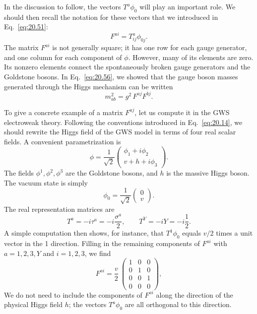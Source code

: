 In the discussion to follow, the vectors $T^a\phi_0$ will play an important
role.  We should then recall the notation for these vectors that we
introduced in Eq.~\eqref{eq:20.51}:
\begin{equation}
  F^{ai} = T^a_{ij}\phi_{0j} .
  \label{eq:21.36}
\end{equation}
The matrix $F^{ai}$ is not generally square; it has one row for each gauge
generator, and one column for each component of $\phi$.  However, many of
its elements are zero.  Its nonzero elements connect the spontaneously broken
gauge generators and the Goldstone bosons.  In Eq.~\eqref{eq:20.56}, we
showed that the gauge boson masses generated through the Higgs mechanism can
be written
\begin{equation}
  m^2_{ab} = g^2\,F^{aj}F^{bj} .
  \label{eq:21.37}
\end{equation}

To give a concrete example of a matrix $F^{aj}$, let us compute it in the
GWS electroweak theory.  Following the conventions introduced in
Eq.~\eqref{eq:20.14}, we should rewrite the Higgs field of the GWS model in
terms of four real scalar fields.  A convenient parametrization is
\begin{equation}
  \phi = \frac{1}{\sqrt{2}}\begin{pmatrix}
    \phi_1 + i\phi_2\\
    v + h + i\phi_3
  \end{pmatrix} .
  \label{eq:21.38}
\end{equation}
The fields $\phi^1, \phi^2, \phi^3$ are the Goldstone bosons, and $h$ is the
massive Higgs boson.  The vacuum state is simply
\begin{equation}
  \phi_0 = \frac{1}{\sqrt{2}}\begin{pmatrix}0\\ v\end{pmatrix} .
\end{equation}
The real representation matrices are
\begin{equation}
  T^a = -i\tau^a = -i\frac{\sigma^a}{2},\qquad
  T^Y = -iY = -i\frac{1}{2} .
\end{equation}
A simple computation then shows, for instance, that $T^1\phi_0$ equals
$v/2$ times a unit vector in the 1 direction.  Filling in the remaining
components of $F^{ai}$ with $a = 1, 2, 3, Y$ and $i = 1, 2, 3$, we find
\begin{equation}
  F^{ai} = \frac{v}{2}\ \begin{pmatrix}
    1 & 0 & 0\\
    0 & 1 & 0\\
    0 & 0 & 1\\
    0 & 0 & 0
  \end{pmatrix},
  \label{eq:21.39}
\end{equation}
We do not need to include the components of $F^{ai}$ along the direction of
the physical Higgs field $h$; the vectors $T^a\phi_0$ are all orthogonal to
this direction.

